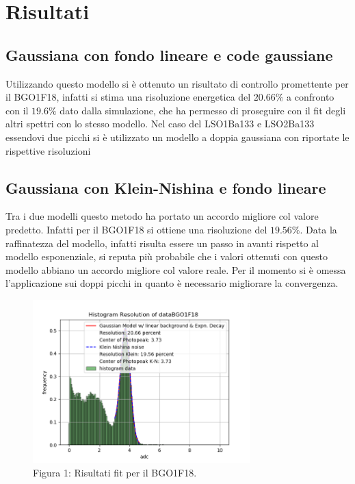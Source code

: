 \documentclass[a4paper]{article}
\begin{document}
\section{Risultati}
\subsection{Gaussiana con fondo lineare e code gaussiane}
Utilizzando questo modello si è ottenuto un risultato di controllo promettente per il BGO1F18, infatti si stima una risoluzione energetica del $20.66\%$ a confronto con il $19.6\%$ dato dalla simulazione, che ha permesso di proseguire con il fit degli altri spettri con lo stesso modello. Nel caso del LSO1Ba133 e LSO2Ba133 essendovi due picchi si è utilizzato un modello a doppia gaussiana con riportate le rispettive risoluzioni
\subsection{Gaussiana con Klein-Nishina e fondo lineare}
Tra i due modelli questo metodo ha portato un accordo migliore col valore predetto. Infatti per il BGO1F18 si ottiene una risoluzione del $19.56\%$. Data la raffinatezza del modello, infatti risulta essere un passo in avanti rispetto al modello esponenziale, si reputa più probabile che i valori ottenuti con questo modello abbiano un accordo migliore col valore reale. Per il momento si è omessa l'applicazione sui doppi picchi in quanto è necessario migliorare la convergenza.
\begin{figure}[H]
\centering
\includegraphics[width=0.75\textwidth]{histkleindataBGO1F18}
\caption{Figura 1: Risultati fit per il BGO1F18.}
\end{figure}
\end{document}
